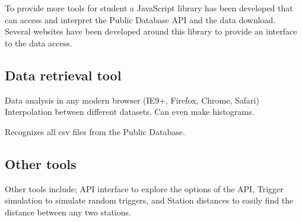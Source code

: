 \section{\jsparc}

To provide more tools for student a JavaScript library has been
developed that can access and interpret the Public Database API and the
data download. Several websites have been developed around this library
to provide an interface to the data access.


\subsection{Data retrieval tool}

Data analysis in any modern browser (IE9+, Firefox, Chrome, Safari)
Interpolation between different datasets. Can even make histograms.

Recognizes all csv files from the Public Database.


\subsection{Other tools}

Other tools include; API interface to explore the options of the API,
Trigger simulation to simulate random triggers, and Station distances to
easily find the distance between any two stations.
